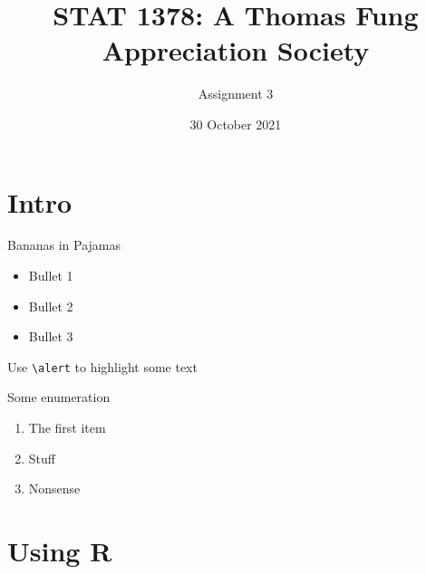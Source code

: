 \documentclass[10pt,ignorenonframetext,aspectratio=169]{beamer}
\title[]{STAT 1378: A Thomas Fung Appreciation Society}
\subtitle{Assignment 3}
\date[
      30 October 2021
  ]{
      30 October 2021
        }
\providecommand{\tightlist}{%
  \setlength{\itemsep}{0pt}\setlength{\parskip}{0pt}}
\begin{document}
  \begin{frame}[plain]
  \titlepage
  \end{frame}



\hypertarget{intro}{%
\section{Intro}\label{intro}}

\begin{frame}[fragile]{Bananas in Pajamas}
\protect\hypertarget{bananas-in-pajamas}{}
\begin{itemize}[<+->]
\tightlist
\item
  Bullet 1
\item
  Bullet 2
\item
  Bullet 3
\end{itemize}

Use \texttt{\textbackslash{}alert} to \alert{highlight} some text

\begin{block}{Some enumeration}
\protect\hypertarget{some-enumeration}{}
\begin{enumerate}[<+->]
\tightlist
\item
  The first item
\item
  Stuff
\item
  Nonsense
\end{enumerate}
\end{block}
\end{frame}

\hypertarget{using-r}{%
\section{Using R}\label{using-r}}
\end{document}
